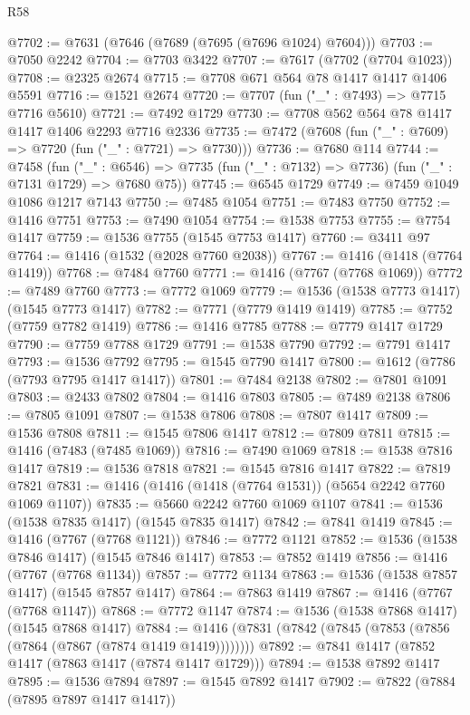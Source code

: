 \begin{lexlean}{R58}
\begin{coremodule}
{{@7702 := @7631 (@7646 (@7689 (@7695 (@7696 @1024) @7604)))
@7703 := @7050 @2242
@7704 := @7703 @3422
@7707 := @7617 (@7702 (@7704 @1023))
@7708 := @2325 @2674
@7715 := @7708 @671 @564 @78 @1417 @1417 @1406 @5591
@7716 := @1521 @2674
@7720 := @7707 (fun ("_" : @7493) => @7715 @7716 @5610)
@7721 := @7492 @1729
@7730 := @7708 @562 @564 @78 @1417 @1417 @1406 @2293 @7716 @2336
@7735 := @7472 (@7608 (fun ("_" : @7609) => @7720 (fun ("_" : @7721) => @7730)))
@7736 := @7680 @114
@7744 := @7458
    (fun ("_" : @6546) => @7735 (fun ("_" : @7132) => @7736) (fun ("_" : @7131 @1729) => @7680 @75))
@7745 := @6545 @1729
@7749 := @7459 @1049 @1086 @1217 @7143
@7750 := @7485 @1054
@7751 := @7483 @7750
@7752 := @1416 @7751
@7753 := @7490 @1054
@7754 := @1538 @7753
@7755 := @7754 @1417
@7759 := @1536 @7755 (@1545 @7753 @1417)
@7760 := @3411 @97
@7764 := @1416 (@1532 (@2028 @7760 @2038))
@7767 := @1416 (@1418 (@7764 @1419))
@7768 := @7484 @7760
@7771 := @1416 (@7767 (@7768 @1069))
@7772 := @7489 @7760
@7773 := @7772 @1069
@7779 := @1536 (@1538 @7773 @1417) (@1545 @7773 @1417)
@7782 := @7771 (@7779 @1419 @1419)
@7785 := @7752 (@7759 @7782 @1419)
@7786 := @1416 @7785
@7788 := @7779 @1417 @1729
@7790 := @7759 @7788 @1729
@7791 := @1538 @7790
@7792 := @7791 @1417
@7793 := @1536 @7792
@7795 := @1545 @7790 @1417
@7800 := @1612 (@7786 (@7793 @7795 @1417 @1417))
@7801 := @7484 @2138
@7802 := @7801 @1091
@7803 := @2433 @7802
@7804 := @1416 @7803
@7805 := @7489 @2138
@7806 := @7805 @1091
@7807 := @1538 @7806
@7808 := @7807 @1417
@7809 := @1536 @7808
@7811 := @1545 @7806 @1417
@7812 := @7809 @7811
@7815 := @1416 (@7483 (@7485 @1069))
@7816 := @7490 @1069
@7818 := @1538 @7816 @1417
@7819 := @1536 @7818
@7821 := @1545 @7816 @1417
@7822 := @7819 @7821
@7831 := @1416 (@1416 (@1418 (@7764 @1531)) (@5654 @2242 @7760 @1069 @1107))
@7835 := @5660 @2242 @7760 @1069 @1107
@7841 := @1536 (@1538 @7835 @1417) (@1545 @7835 @1417)
@7842 := @7841 @1419
@7845 := @1416 (@7767 (@7768 @1121))
@7846 := @7772 @1121
@7852 := @1536 (@1538 @7846 @1417) (@1545 @7846 @1417)
@7853 := @7852 @1419
@7856 := @1416 (@7767 (@7768 @1134))
@7857 := @7772 @1134
@7863 := @1536 (@1538 @7857 @1417) (@1545 @7857 @1417)
@7864 := @7863 @1419
@7867 := @1416 (@7767 (@7768 @1147))
@7868 := @7772 @1147
@7874 := @1536 (@1538 @7868 @1417) (@1545 @7868 @1417)
@7884 := @1416 (@7831 (@7842 (@7845 (@7853 (@7856 (@7864 (@7867 (@7874 @1419 @1419))))))))
@7892 := @7841 @1417 (@7852 @1417 (@7863 @1417 (@7874 @1417 @1729)))
@7894 := @1538 @7892 @1417
@7895 := @1536 @7894
@7897 := @1545 @7892 @1417
@7902 := @7822 (@7884 (@7895 @7897 @1417 @1417))
}}
\end{coremodule}
\end{lexlean}
